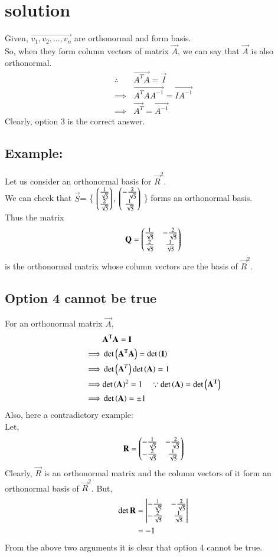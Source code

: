 \documentclass[journal,12pt,twocolumn]{IEEEtran}
\begin{document}
\section{solution}
Given, $\vec {v_1, v_2,..., v_n}$ are orthonormal and form basis.\\
So, when they form column vectors of matrix $\vec A $, we can say that $\vec A$ is also orthonormal.
\begin{align}
    \therefore \quad & \vec {A^T A} =\vec I\\
    \implies & \vec{A^T A A^{-1}}= \vec {I A^{-1}}\\
    \implies & \vec {A^T} = \vec {A^{-1}}
\end{align}
Clearly, option 3 is the correct answer.
\subsection{Example:}
Let us consider an orthonormal basis for $\vec R^2$.\\[1em]
We can check that $\vec S$= \{ $\begin{pmatrix}\frac{1}{\sqrt{5}}\\ \frac{2}{\sqrt{5}}\end{pmatrix}$, $\begin{pmatrix}-\frac{2}{\sqrt{5}}\\ \frac{1}{\sqrt{5}}\end{pmatrix}$ \} forms an orthonormal basis.\\
Thus the matrix
\begin{align}
    \mathbf Q = \begin{pmatrix}\frac{1}{\sqrt{5}} & -\frac{2}{\sqrt{5}}\\ \frac{2}{\sqrt{5}} & \frac{1}{\sqrt{5}} \end{pmatrix}
\end{align}
is the orthonormal matrix whose column vectors are the basis of $\vec R^2$.
\subsection{Option 4 cannot be true}
For an orthonormal matrix $\vec A$,
\begin{align}
    & \mathbf{A^TA} =\mathbf I\\
    \implies &\det \left(\mathbf{A^TA}\right)=\det\left( \mathbf I\right)\\
    \implies & \det \left(\mathbf A^T\right) \det\left(\mathbf A\right)= 1\\
    \implies & {\det\left(\mathbf A\right)}^2 = 1 \quad \because \det\left(\mathbf A\right)= \det\left(\mathbf{A^T}\right)\\
    \implies & \det\left(\mathbf A\right) =\pm 1
\end{align}
Also, here a contradictory example:\\
Let,
\begin{align}
    \mathbf R = \begin{pmatrix}-\frac{1}{\sqrt{5}} & -\frac{2}{\sqrt{5}}\\ -\frac{2}{\sqrt{5}} & \frac{1}{\sqrt{5}}\end{pmatrix}
\end{align}
Clearly, $\vec R$  is an orthonormal matrix and the column vectors of it form an orthonormal basis of $\vec R^2$.
But,
\begin{align}
    \det {\mathbf R} &= \begin{vmatrix}-\frac{1}{\sqrt{5}} & -\frac{2}{\sqrt{5}}\\ -\frac{2}{\sqrt{5}} & \frac{1}{\sqrt{5}}\end{vmatrix}\\
    &= -1
\end{align}
From the above two arguments it is clear that option 4 cannot be true.
\end{document}
